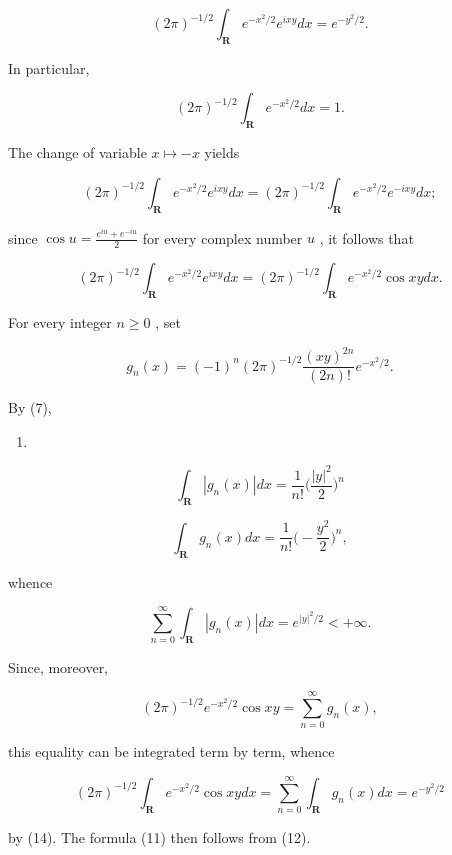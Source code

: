 \[
(2 \pi) ^ {- 1 / 2} \int_ {\mathbf {R}} e ^ {- x ^ {2} / 2} e ^ {i x y} d x = e ^ {- y ^ {2} / 2}.\tag{11}
\]

In particular,

\[
(2 \pi) ^ {- 1 / 2} \int_ {\mathbf {R}} e ^ {- x ^ {2} / 2} d x = 1.
\]

The change of variable \(x \mapsto -x\) yields

\[
(2 \pi) ^ {- 1 / 2} \int_ {\mathbf {R}} e ^ {- x ^ {2} / 2} e ^ {i x y} d x = (2 \pi) ^ {- 1 / 2} \int_ {\mathbf {R}} e ^ {- x ^ {2} / 2} e ^ {- i x y} d x;
\]

since \(\cos u = \frac{e^{iu} + e^{-iu}}{2}\) for every complex number \(u\) , it follows that

\[
(2 \pi) ^ {- 1 / 2} \int_ {\mathbf {R}} e ^ {- x ^ {2} / 2} e ^ {i x y} d x = (2 \pi) ^ {- 1 / 2} \int_ {\mathbf {R}} e ^ {- x ^ {2} / 2} \cos x y d x.\tag{12}
\]

For every integer \(n \geqslant 0\) , set

\[
g _ {n} (x) = (- 1) ^ {n} (2 \pi) ^ {- 1 / 2} \frac {(x y) ^ {2 n}}{(2 n) !} e ^ {- x ^ {2} / 2}.
\]

By (7),

\begin{enumerate}
\def\labelenumi{(\arabic{enumi})}
\setcounter{enumi}{12}
\tightlist
\item
\end{enumerate}

\[
\int_ {\mathbf {R}} | g _ {n} (x) | d x = \frac {1}{n !} \biggl (\frac {| y | ^ {2}}{2} \biggr) ^ {n}\tag{14}
\]

\[
\int_ {\mathbf {R}} g _ {n} (x) d x = \frac {1}{n !} \Big (- \frac {y ^ {2}}{2} \Big) ^ {n},
\]

whence

\[
\sum_ {n = 0} ^ {\infty} \int_ {\mathbf {R}} | g _ {n} (x) | d x = e ^ {| y | ^ {2} / 2} <   + \infty .
\]

Since, moreover,

\[
(2 \pi) ^ {- 1 / 2} e ^ {- x ^ {2} / 2} \cos x y = \sum_ {n = 0} ^ {\infty} g _ {n} (x),
\]

this equality can be integrated term by term, whence

\[
(2 \pi) ^ {- 1 / 2} \int_ {\mathbf {R}} e ^ {- x ^ {2} / 2} \cos x y d x = \sum_ {n = 0} ^ {\infty} \int_ {\mathbf {R}} g _ {n} (x) d x = e ^ {- y ^ {2} / 2}
\]

by (14). The formula (11) then follows from (12).

